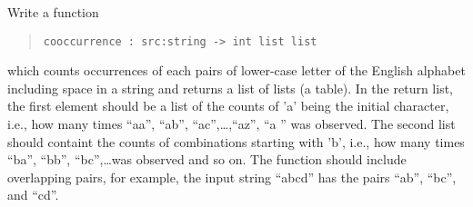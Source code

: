 \label{coocurrence}
Write a function
\begin{quote}
  \mbox{\lstinline!cooccurrence : src:string -> int list list!}
\end{quote}
which counts occurrences of each pairs of lower-case letter of the
English alphabet including space in a string and returns a list of
lists (a table).  In the return list, the first element should be a
list of the counts of 'a' being the initial character, i.e., how many times ``aa'',
``ab'', ``ac'',\ldots,``az'', ``a '' was observed. The second list should containt
the counts of combinations starting with 'b', i.e., how many times
``ba'', ``bb'', ``bc'',\ldots was observed and so on. The function
should include overlapping pairs, for example, the input string
``abcd'' has the pairs ``ab'', ``bc'', and ``cd''.
